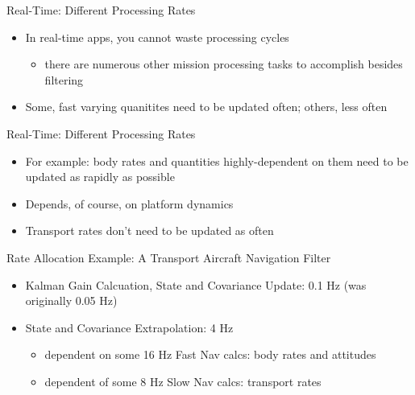 \begin{frame}
Real-Time: Different Processing Rates
 \begin{itemize}
 \item In real-time apps, you cannot waste processing cycles
	\begin{itemize}
		\item there are numerous other mission processing tasks to accomplish besides filtering
	\end{itemize}
 \item Some, fast varying quanitites need to be updated often; others, less often
\end{itemize}
\end{frame}

\begin{frame}
Real-Time: Different Processing Rates
\begin{itemize}
  \item For example: body rates and quantities highly-dependent on them need to be updated as rapidly as possible
 \item Depends, of course, on platform dynamics
 \item Transport rates don't need to be updated as often
\end{itemize}
\end{frame}

\begin{frame}
Rate Allocation Example: A Transport Aircraft Navigation Filter
\begin{itemize}
  \item Kalman Gain Calcuation, State and Covariance Update: 0.1 Hz (was originally 0.05 Hz)
  \item State and Covariance Extrapolation: 4 Hz
  \begin{itemize}
	\item dependent on some 16 Hz Fast Nav calcs: body rates and attitudes 
    \item dependent of some 8 Hz Slow Nav calcs: transport rates
  \end{itemize}  
\end{itemize} 
\end{frame}
